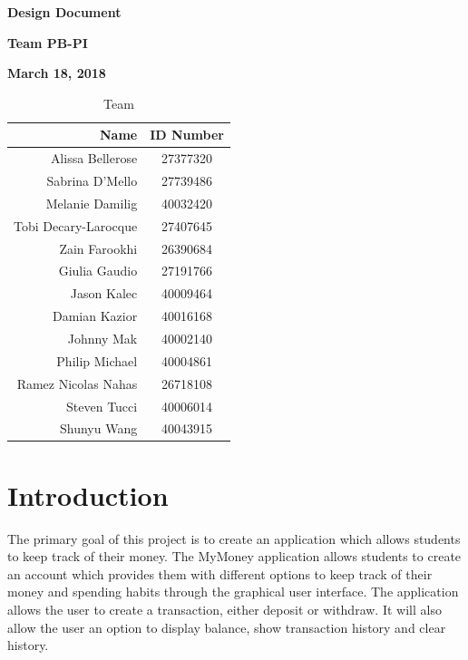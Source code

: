 \documentclass[12pt]{article}
\begin{document}
\vspace*{0.5in}
\centerline{\bf\Large Design Document}

\vspace*{0.5in}
\centerline{\bf\Large Team PB-PI}

\vspace*{0.5in}
\centerline{\bf\Large March 18, 2018}

\vspace*{1.5in}
\begin{table}[htbp]
\caption{Team}
\begin{center}
\begin{tabular}{|r | c|}
\hline
Name & ID Number \\
\hline\hline
Alissa Bellerose & 27377320 \\
Sabrina D'Mello & 27739486 \\
Melanie Damilig & 40032420 \\
Tobi Decary-Larocque & 27407645 \\
Zain Farookhi & 26390684 \\
Giulia Gaudio & 27191766 \\
Jason Kalec & 40009464 \\
Damian Kazior & 40016168 \\
Johnny Mak & 40002140 \\
Philip Michael & 40004861 \\
Ramez Nicolas Nahas & 26718108 \\
Steven Tucci & 40006014 \\
Shunyu Wang & 40043915 \\
\hline
\end{tabular}
\end{center}
\end{table}

\clearpage

\section{Introduction}
The primary goal of this project is to create an application which allows students to keep track of their money. The MyMoney application allows students to create an account which provides them with different options to keep track of their money and spending habits through the graphical user interface. The application allows the user to create a transaction, either deposit or withdraw. It will also allow the user an option to display balance, show transaction history and clear history. 
\end{document}
